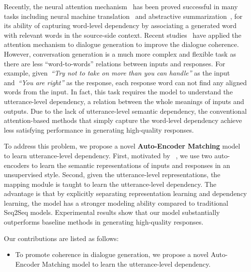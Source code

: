 \documentclass[11pt,a4paper]{article}
\begin{document}
\begin{CJK}{UTF8}{song}
Recently, the neural attention mechanism~\cite{DBLP:conf/emnlp/LuongPM15,DBLP:conf/nips/VaswaniSPUJGKP17} has been proved successful in many tasks including neural machine translation~\cite{DBLP:journals/corr/abs-1805-04871} and abstractive summarization~\cite{DBLP:journals/corr/abs-1805-03989}, for its ability of capturing word-level dependency by associating a  generated word with relevant words in the source-side context. Recent studies~\cite{DBLP:conf/aaai/MeiBW17,DBLP:conf/aaai/SerbanKTTZBC17} have applied the attention mechanism to dialogue generation to improve the dialogue coherence. However, conversation generation is a much more complex and flexible task as there are less ``word-to-words'' relations between inputs and responses.
For example, given~\textit{``Try not to take on more than you can handle''} as the input and~\textit{``You are right''} as the response, each response word can not find any aligned words from the input. 
In fact, this task requires the model to understand the utterance-level dependency, a relation between the whole meanings of inputs and outputs.
Due to the lack of utterance-level semantic dependency, the conventional attention-based methods that simply capture the word-level dependency achieve less satisfying performance in generating high-quality responses.



To address this problem, we propose a novel \textbf{Auto-Encoder Matching} model to learn utterance-level dependency. First, motivated by ~\citet{DBLP:journals/corr/abs-1805-04869}, we use two auto-encoders to learn the semantic representations of inputs and responses in an unsupervised style. Second, given the utterance-level representations, the mapping module is taught to learn the utterance-level dependency. The advantage is that by explicitly separating representation learning and dependency learning, the model has a stronger modeling ability compared to traditional Seq2Seq models.   Experimental results show that our model substantially outperforms baseline methods in generating high-quality responses.















Our contributions are listed as follows:
\begin{itemize}
\item To promote coherence in dialogue generation, we propose a novel Auto-Encoder Matching model to learn the utterance-level dependency. 


\end{itemize}
\end{CJK}
\end{document}
